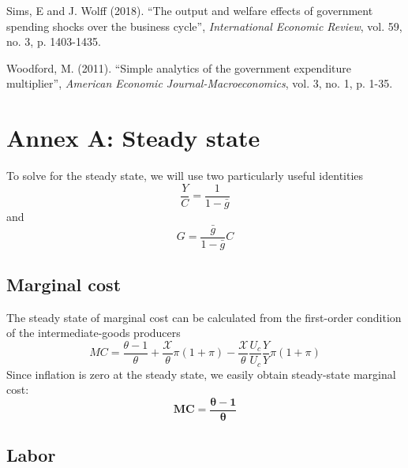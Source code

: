 \documentclass[12pt,letterpaper]{article}
\newcommand{\gbar}{\bar{g}}
\newcommand{\XX}{\mathcal{X}}
\begin{document}
\begin{list}{}{\setlength{\leftmargin}{2em}\setlength{\itemindent}{-2em}\setlength{\itemsep}{0.3em}}
\item Sims, E and J. Wolff (2018). ``The output and welfare effects of government spending shocks over the business cycle'', \emph{International Economic Review}, vol. 59, no. 3, p. 1403-1435.
\item Woodford, M. (2011). ``Simple analytics of the government expenditure multiplier'', \emph{American Economic Journal-Macroeconomics}, vol. 3, no. 1, p. 1-35.
\end{list}

\newpage
\appendix
\section*{Annex A: Steady state}

To solve for the steady state, we will use two particularly useful identities
\begin{equation}
\frac{Y}{C} = \frac{1}{1-\gbar} \tag{1}
\end{equation}
and
\begin{equation}
G = \frac{\gbar}{1-\gbar}C \tag{2}
\end{equation}

\subsection*{Marginal cost}

The steady state of marginal cost can be calculated from the first-order condition of the intermediate-goods producers
\begin{equation*}
MC = \frac{\theta-1}{\theta} + \frac{\XX}{\theta}\pi(1+\pi) - \frac{\XX}{\theta}\frac{U_c}{U_c}\frac{Y}{Y}\pi(1+\pi)
\end{equation*}
Since inflation is zero at the steady state, we easily obtain steady-state marginal cost:
\begin{equation*}
\boldsymbol{MC = \frac{\theta-1}{\theta}}
\end{equation*}

\subsection*{Labor}
\end{document}
